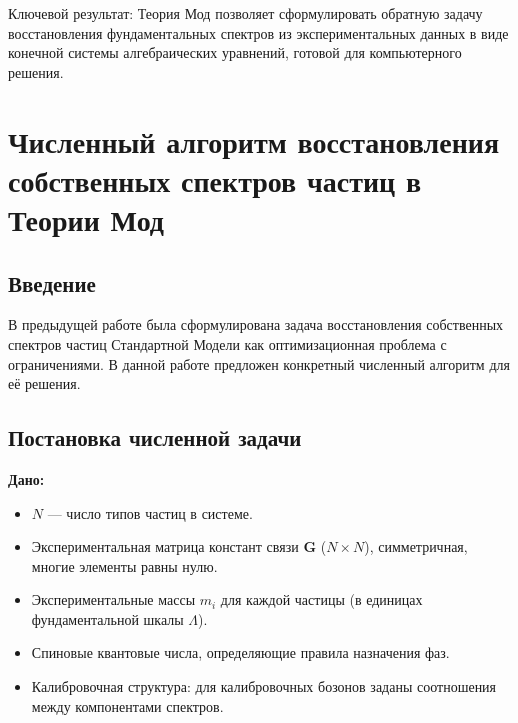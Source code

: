 \documentclass[12pt,a4paper]{article}
\begin{document}
Ключевой результат: Теория Мод позволяет сформулировать обратную задачу восстановления фундаментальных спектров из экспериментальных данных в виде конечной системы алгебраических уравнений, готовой для компьютерного решения.

\newpage
\section{Численный алгоритм восстановления собственных спектров частиц в Теории Мод}

\begin{abstract}
Предложен численный алгоритм для восстановления собственных спектров частиц Стандартной Модели в рамках Теории Мод. Задача сформулирована как нелинейная оптимизация с ограничениями, где целевой функцией является спектральная энтропия, а ограничениями --- экспериментальные массы, константы связи, принцип компенсации и калибровочные симметрии. Предложен метод предобработки для понижения размерности, комбинированный алгоритм на основе градиентного спуска Adam с последовательным увеличением штрафных множителей (SUMT). Приведён псевдокод, оценка вычислительной сложности и анализ особых случаев (безмассовые частицы). Показано, что для $N = 30$--$40$ типов частиц задача решается за секунды на стандартном CPU.

\bigskip
\noindent\textbf{Ключевые слова:} Теория Мод, численная оптимизация, спектральная энтропия, восстановление спектров, Стандартная Модель.
\end{abstract}

\subsection{Введение}
В предыдущей работе была сформулирована задача восстановления собственных спектров частиц Стандартной Модели как оптимизационная проблема с ограничениями. В данной работе предложен конкретный численный алгоритм для её решения.

\subsection{Постановка численной задачи}
\textbf{Дано:}
\begin{itemize}
    \item $N$ --- число типов частиц в системе.
    \item Экспериментальная матрица констант связи $\mathbf{G}$ ($N \times N$), симметричная, многие элементы равны нулю.
    \item Экспериментальные массы $m_i$ для каждой частицы (в единицах фундаментальной шкалы $\Lambda$).
    \item Спиновые квантовые числа, определяющие правила назначения фаз.
    \item Калибровочная структура: для калибровочных бозонов заданы соотношения между компонентами спектров.
\end{itemize}
\end{document}
